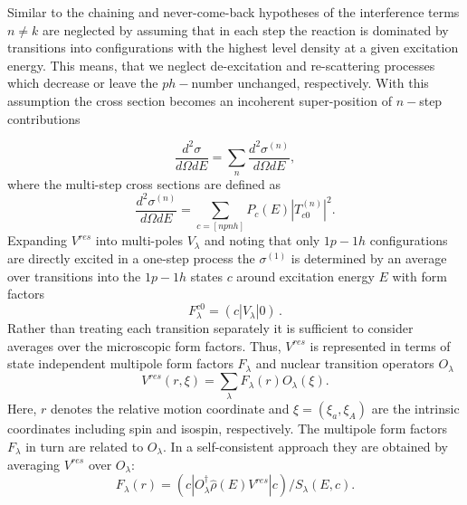 \documentclass[twocolumn,amsmath,amssymb,10pt,groupedaddress,a4paper]{revtex4}
\begin{document}
Similar to the chaining and never-come-back hypotheses of \cite{FKK}
the interference terms $n\ne k$ are neglected by assuming that in
each step the reaction is dominated by transitions into configurations
with the highest level density at a given excitation energy. This
means, that we neglect de-excitation and re-scattering processes which
decrease or leave the $ph-$number unchanged, respectively. With this
assumption the cross section becomes an incoherent super-position
of $n-$step contributions

\begin{equation}
\frac{d^{2}\sigma}{d\Omega dE}=\sum_{n}{\frac{d^{2}\sigma^{(n)}}{d\Omega dE}},\label{sigma0}
\end{equation}
\noindent where the multi-step cross sections are defined as
\begin{equation}
\frac{d^{2}\sigma^{(n)}}{d\Omega dE}=\sum_{c=[npnh]}{P_{c}(E)|T_{c0}^{(n)}|^{2}}.\label{sign}
\end{equation}
\noindent Expanding $V^{res}$ into multi-poles $V_{\lambda}$ and noting that
only $1p-1h$ configurations are directly excited in a one-step process
the $\sigma^{(1)}$ is determined by an average over transitions into
the $1p-1h$ states $c$ around excitation energy $E$ with form factors
\begin{equation}
F_{\lambda}^{c0}=(c|V_{\lambda}|0)\,.
\end{equation}
\noindent Rather than treating each transition separately it is sufficient to
consider averages over the microscopic form factors. Thus, $V^{res}$
is represented in terms of state independent multipole form factors
$F_{\lambda}$ and nuclear transition operators $O_{\lambda}$
\begin{equation}
V^{res}(r,\xi)=\sum_{\lambda}{F_{\lambda}(r)O_{\lambda}(\xi)}.\label{vres}
\end{equation}
\noindent Here, $r$ denotes the relative motion coordinate and $\xi=(\xi_{a},\xi_{A})$
are the intrinsic coordinates including spin and isospin, respectively.
The multipole form factors $F_{\lambda}$ in turn are related to $O_{\lambda}$.
In a self-consistent approach they are obtained by averaging $V^{res}$
over $O_{\lambda}$:
\begin{equation}
F_{\lambda}(r)=(c|O_{\lambda}^{\dag}\hat{\rho}(E)V^{res}|c)/S_{\lambda}(E,c).\label{formf}
\end{equation}
\end{document}
